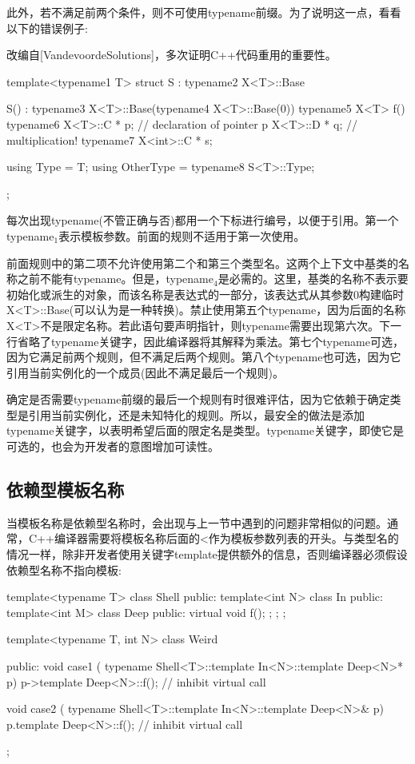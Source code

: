 此外，若不满足前两个条件，则不可使用typename前缀。为了说明这一点，看看以下的错误例子:

\begin{notice}改编自[VandevoordeSolutions]，多次证明C++代码重用的重要性。
\end{notice}

\begin{cpp}
template<typename1 T>
struct S : typename2 X<T>::Base {
	S() : typename3 X<T>::Base(typename4 X<T>::Base(0)) {
	}
	typename5 X<T> f() {
		typename6 X<T>::C * p; // declaration of pointer p
		X<T>::D * q; // multiplication!
	}
	typename7 X<int>::C * s;
	
	using Type = T;
	using OtherType = typename8 S<T>::Type;
};
\end{cpp}

每次出现typename(不管正确与否)都用一个下标进行编号，以便于引用。第一个typename$_1$表示模板参数。前面的规则不适用于第一次使用。

前面规则中的第二项不允许使用第二个和第三个类型名。这两个上下文中基类的名称之前不能有typename。但是，typename$_4$是必需的。这里，基类的名称不表示要初始化或派生的对象，而该名称是表达式的一部分，该表达式从其参数0构建临时X<T>::Base(可以认为是一种转换)。禁止使用第五个typename，因为后面的名称X<T>不是限定名称。若此语句要声明指针，则typename需要出现第六次。下一行省略了typename关键字，因此编译器将其解释为乘法。第七个typename可选，因为它满足前两个规则，但不满足后两个规则。第八个typename也可选，因为它引用当前实例化的一个成员(因此不满足最后一个规则)。

确定是否需要typename前缀的最后一个规则有时很难评估，因为它依赖于确定类型是引用当前实例化，还是未知特化的规则。所以，最安全的做法是添加typename关键字，以表明希望后面的限定名是类型。typename关键字，即使它是可选的，也会为开发者的意图增加可读性。

\subsection{依赖型模板名称}

当模板名称是依赖型名称时，会出现与上一节中遇到的问题非常相似的问题。通常，C++编译器需要将模板名称后面的<作为模板参数列表的开头。与类型名的情况一样，除非开发者使用关键字template提供额外的信息，否则编译器必须假设依赖型名称不指向模板:

\begin{cpp}
template<typename T>
class Shell {
	public:
	template<int N>
	class In {
		public:
		template<int M>
		class Deep {
			public:
			virtual void f();
		};
	};
};

template<typename T, int N>
class Weird {
public:
	void case1 (
	typename Shell<T>::template In<N>::template Deep<N>* p) {
		p->template Deep<N>::f(); // inhibit virtual call
	}

	void case2 (
	typename Shell<T>::template In<N>::template Deep<N>& p) {
		p.template Deep<N>::f(); // inhibit virtual call
	}
};
\end{cpp}

